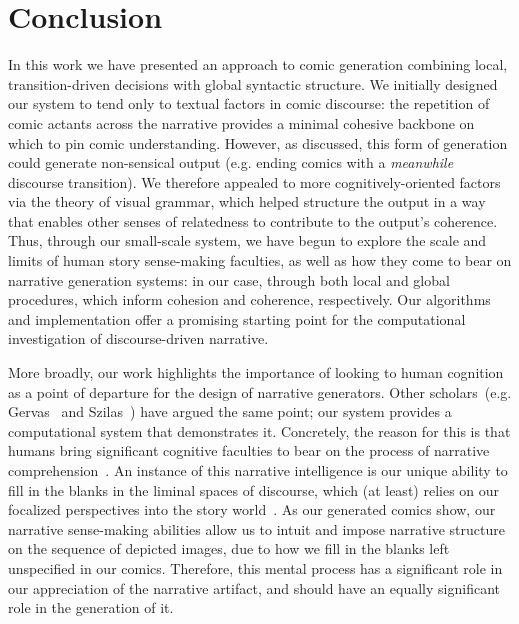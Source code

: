 \section{Conclusion}

In this work we have presented an approach to comic generation combining
local, transition-driven decisions with global syntactic structure. We
initially designed our system to tend only to textual factors in
comic discourse: the repetition of comic actants across the narrative
provides a minimal cohesive backbone on which to pin comic understanding.
%
However, as discussed, this form of generation could generate non-sensical
output (e.g. ending comics with a \emph{meanwhile} discourse transition).
We therefore appealed to more cognitively-oriented factors via the theory
of visual grammar, which helped structure the output in a way that enables
other senses of relatedness to contribute to the output's coherence.
%
Thus, through our small-scale system, we have begun to explore the scale
and limits of human story sense-making faculties, as well as how they come
to bear on narrative generation systems: in our case, through both local
and global procedures, which inform cohesion and coherence, respectively. 
%
Our algorithms and implementation offer a promising starting point for the
computational investigation of discourse-driven narrative.

More broadly, our work highlights the importance of looking to human
cognition as a point of departure for the design of narrative generators.
Other scholars~(e.g. Gervas~\cite{gervas2009computational} and
Szilas~\cite{szilas2010requirements}) have argued the same point; our
system provides a computational system that demonstrates it. Concretely,
the reason for this is that humans bring significant cognitive faculties to
bear on the process of narrative
comprehension~\cite{herman2013storytelling}.  An instance of this narrative
intelligence is our unique ability to fill in the blanks in the liminal
spaces of discourse, which (at least) relies on  our focalized perspectives
into the story world~\cite{genette1983narrative}.  As our generated comics
show, our narrative sense-making abilities allow us to intuit and impose
narrative structure on the sequence of depicted images, due to how we fill
in the blanks left unspecified in our comics. Therefore, this mental
process has a significant role in our appreciation of the narrative
artifact, and should have an equally significant role in the generation of
it.
